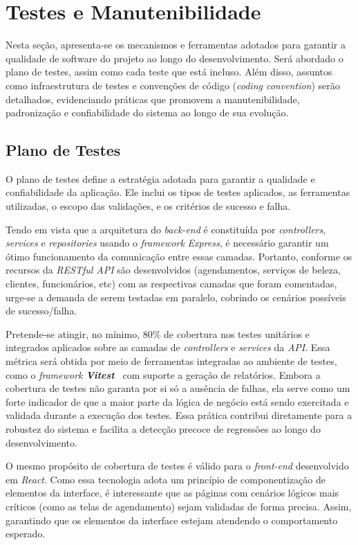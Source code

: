 \section{Testes e Manutenibilidade}
Nesta seção, apresenta-se os mecanismos e ferramentas adotados para garantir a qualidade de software do projeto ao longo do desenvolvimento.
Será abordado o plano de testes, assim como cada teste que está incluso. Além disso, assuntos como infraestrutura de testes e convenções de código (\textit{coding convention})
serão detalhados, evidenciando práticas que promovem a manutenibilidade, padronização e confiabilidade do sistema ao longo de sua evolução.

\subsection{Plano de Testes}
O plano de testes define a estratégia adotada para garantir a qualidade e confiabilidade da aplicação. 
Ele inclui os tipos de testes aplicados, as ferramentas utilizadas, o escopo das validações, e os critérios de sucesso e falha.

Tendo em vista que a arquitetura do \textit{back-end} é constituída por \textit{controllers}, \textit{services} e \textit{repositories} usando o \emph{framework} \textit{Express}, 
é necessário garantir um ótimo funcionamento da comunicação entre essas camadas. Portanto, conforme os recursos da \textit{RESTful API} são desenvolvidos (agendamentos, serviços de beleza, clientes, funcionários, etc) com as respectivas camadas que foram comentadas, urge-se a demanda de serem testadas em paralelo, cobrindo os cenários possíveis de sucesso/falha. 

Pretende-se atingir, no mínimo, 80\% de cobertura nos testes unitários e integrados aplicados sobre as camadas de \textit{controllers} e \textit{services} da \textit{API}. Essa métrica será obtida por meio de ferramentas integradas ao ambiente de testes, como o \textit{framework} \textbf{\textit{Vitest}}~\cite{vitest-2025} com suporte a geração de relatórios. Embora a cobertura de testes não garanta por si só a ausência de falhas, ela serve como um forte indicador de que a maior parte da lógica de negócio está sendo exercitada e validada durante a execução dos testes. Essa prática contribui diretamente para a robustez do sistema e facilita a detecção precoce de regressões ao longo do desenvolvimento.

O mesmo propósito de cobertura de testes é válido para o \textit{front-end} desenvolvido em \textit{React}. Como essa tecnologia adota um princípio de componentização de elementos da interface,
é interessante que as páginas com cenários lógicos mais críticos (como as telas de agendamento) sejam validadas de forma precisa. Assim, garantindo que os elementos da interface estejam atendendo o comportamento esperado.

